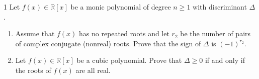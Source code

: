 \documentclass[12pt]{article}
\begin{document}


\vspace{.1in}

\begin{problem}{1}
    Let $f(x) \in \mathbb{R}[x]$ be a monic polynomial of degree $n \ge 1$ with discriminant $\Delta$.

    \begin{enumerate}
        \item[(a)] Assume that $f(x)$ has no repeated roots and let $r_2$ be the number of pairs of complex conjugate (nonreal) roots. Prove that the sign of $\Delta$ is $(-1)^{r_2}$.

        \item[(b)] Let $f(x) \in \mathbb{R}[x]$ be a cubic polynomial. Prove that $\Delta \ge 0$ if and only if the roots of $f(x)$ are all real.
    \end{enumerate}
\end{problem}
\end{document}
